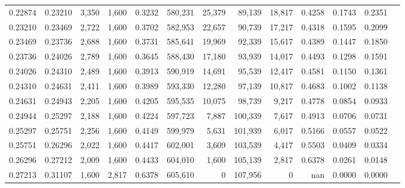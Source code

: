 \begin{tabular}{rrrrrrrrrrrrr}
0.22874 & 0.23210 &  3,350 & 1,600 &                                     0.3232 & 580,231 &  25,379 &  89,139 &  18,817 & 0.4258 & 0.1743 & 0.2351 \\
0.23210 & 0.23469 &  2,722 & 1,600 &                                     0.3702 & 582,953 &  22,657 &  90,739 &  17,217 & 0.4318 & 0.1595 & 0.2099 \\
0.23469 & 0.23736 &  2,688 & 1,600 &                                     0.3731 & 585,641 &  19,969 &  92,339 &  15,617 & 0.4389 & 0.1447 & 0.1850 \\
0.23736 & 0.24026 &  2,789 & 1,600 &                                     0.3645 & 588,430 &  17,180 &  93,939 &  14,017 & 0.4493 & 0.1298 & 0.1591 \\
0.24026 & 0.24310 &  2,489 & 1,600 &                                     0.3913 & 590,919 &  14,691 &  95,539 &  12,417 & 0.4581 & 0.1150 & 0.1361 \\
0.24310 & 0.24631 &  2,411 & 1,600 &                                     0.3989 & 593,330 &  12,280 &  97,139 &  10,817 & 0.4683 & 0.1002 & 0.1138 \\
0.24631 & 0.24943 &  2,205 & 1,600 &                                     0.4205 & 595,535 &  10,075 &  98,739 &   9,217 & 0.4778 & 0.0854 & 0.0933 \\
0.24944 & 0.25297 &  2,188 & 1,600 &                                     0.4224 & 597,723 &   7,887 & 100,339 &   7,617 & 0.4913 & 0.0706 & 0.0731 \\
0.25297 & 0.25751 &  2,256 & 1,600 &                                     0.4149 & 599,979 &   5,631 & 101,939 &   6,017 & 0.5166 & 0.0557 & 0.0522 \\
0.25751 & 0.26296 &  2,022 & 1,600 &                                     0.4417 & 602,001 &   3,609 & 103,539 &   4,417 & 0.5503 & 0.0409 & 0.0334 \\
0.26296 & 0.27212 &  2,009 & 1,600 &                                     0.4433 & 604,010 &   1,600 & 105,139 &   2,817 & 0.6378 & 0.0261 & 0.0148 \\
0.27213 & 0.31107 &  1,600 & 2,817 &                                     0.6378 & 605,610 &       0 & 107,956 &       0 &    nan & 0.0000 & 0.0000 \\
\bottomrule
\end{tabular}
